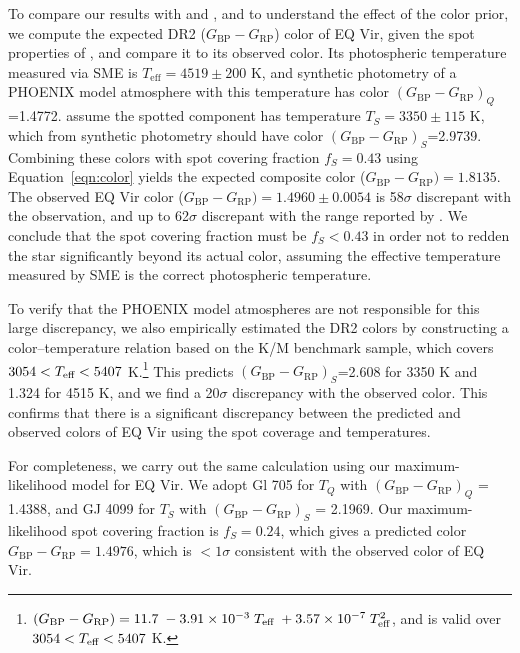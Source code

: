 To compare our results with \citet{saar2001} and \citet{ONeal2004}, and to understand the effect of the color prior, 
we compute the expected \gaia DR2 ($G_\mathrm{BP}-G_\mathrm{RP}$) color of EQ Vir, given the spot properties of \citet{ONeal2004}, and compare it to its observed color. Its photospheric temperature measured via SME is $T_\mathrm{eff} = 4519 \pm 200$ K, and synthetic photometry of a PHOENIX model atmosphere with this temperature has color $(G_\mathrm{BP}-G_\mathrm{RP})_Q$=1.4772. \citet{ONeal2004} assume the spotted component has temperature $T_S = 3350 \pm 115$ K, which from synthetic photometry should have color $(G_\mathrm{BP}-G_\mathrm{RP})_S$=2.9739. Combining these colors with spot covering fraction $f_S = 0.43$ using Equation~\ref{eqn:color} yields the expected composite color ($G_\mathrm{BP}-G_\mathrm{RP})=1.8135$. The observed \gaia EQ Vir color ($G_\mathrm{BP}-G_\mathrm{RP})=1.4960 \pm 0.0054$ is 58$\sigma$ discrepant with the \citet{saar2001} observation, and up to 62$\sigma$ discrepant with the range reported by \citet{ONeal2004}. We conclude that the spot covering fraction must be $f_S < 0.43$ in order not to redden the star significantly beyond its actual color, assuming the effective temperature measured by SME is the correct photospheric temperature.

To verify that the PHOENIX model atmospheres are not responsible for this large discrepancy, we also empirically estimated the DR2 colors by constructing a color--temperature relation based on the \citet{boyajian2012} K/M benchmark sample, which covers  $3054 < T_{\mbox{\scriptsize eff}} < 5407$ K.\footnote{$(G_\mathrm{BP}-G_\mathrm{RP}) = 11.7\; -3.91\times10^{-3}\; T_{\mbox{\scriptsize eff}}\;  +3.57\times10^{-7}\; T_{\mbox{\scriptsize eff}}^2$,  and is valid over $3054 < T_{\mbox{\scriptsize eff}} < 5407$ K.}
This predicts $(G_\mathrm{BP}-G_\mathrm{RP})_S$=2.608 for 3350 K and 1.324 for 4515 K, and we find a 20$\sigma$ discrepancy with the observed color. This confirms that there is a significant discrepancy between the predicted and observed colors of EQ Vir using the \citet{ONeal2004} spot coverage and temperatures.

For completeness, we carry out the same calculation using our maximum-likelihood model for EQ Vir. We adopt Gl 705 for $T_Q$ with $(G_\mathrm{BP}-G_\mathrm{RP})_Q$ = 1.4388, and GJ 4099 for $T_S$ with $(G_\mathrm{BP}-G_\mathrm{RP})_S$ = 2.1969. Our maximum-likelihood spot covering fraction is $f_S = 0.24$, which gives a predicted color $G_\mathrm{BP}-G_\mathrm{RP} = 1.4976$, which is $<1\sigma$ consistent with the observed color of EQ Vir. 

